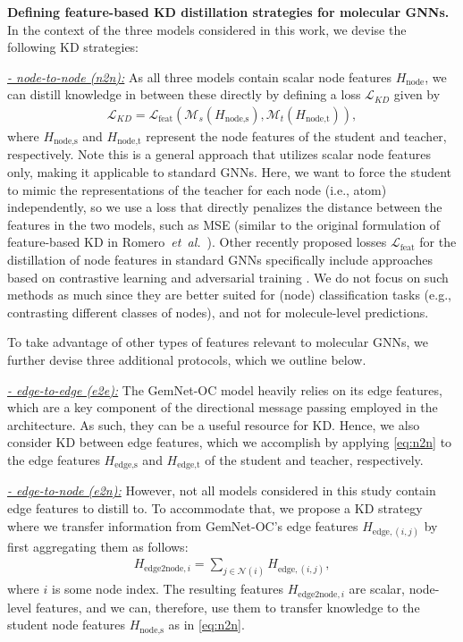 \documentclass{article}
\newcommand{\loss}{\mathcal{L}}
\begin{document}
\textbf{Defining feature-based KD distillation strategies for molecular GNNs.} 
In the context of the three models considered in this work, we devise the following KD strategies:

\underline{\emph{- node-to-node (n2n):}} As all three models contain scalar node features $H_{\text{node}}$, we can distill knowledge in between these directly by defining a loss $\loss_{KD}$ given by
\begin{align}
\label{eq:n2n}
    \loss_{KD} = \loss_{\text{feat}} (\mathcal{M}_{s}(H_{\text{node}, \text{s}}), \mathcal{M}_{t}(H_{\text{node},\text{t}})),
\end{align}
where $H_{\text{node}, \text{s}}$ and $H_{\text{node}, \text{t}}$ represent the node features of the student and teacher, respectively.
% 
Note this is a general approach that utilizes scalar node features only, making it applicable to standard GNNs. Here, we want to force the student to mimic the representations of the teacher for each node (i.e., atom) independently, so we use a loss that directly penalizes the distance between the features in the two models, such as MSE (similar to the original formulation of feature-based KD in Romero~\textit{et~al.}~\citep{romero2015fitnets}). Other recently proposed losses $\loss_{\text{feat}}$ for the distillation of node features in standard GNNs specifically include approaches based on contrastive learning \cite{yang2021distilling, joshi2022, yu2022sail, huo2022t2} and adversarial training \cite{he2022compressing}. We do not focus on such methods as much since they are better suited for (node) classification tasks (e.g., contrasting different classes of nodes), and not for molecule-level predictions.

To take advantage of other types of features relevant to molecular GNNs, we further devise three additional protocols, which we outline below.

\underline{\emph{- edge-to-edge (e2e):}} The GemNet-OC model heavily relies on its edge features, which are a key component of the directional message passing employed in the architecture. As such, they can be a useful resource for KD. Hence, we also consider KD between edge features, which we accomplish by applying \cref{eq:n2n} to the edge features $H_{\text{edge}, \text{s}}$ and $H_{\text{edge},\text{t}}$ of the student and teacher, respectively.

\underline{\emph{- edge-to-node (e2n):}} However, not all models considered in this study contain edge features to distill to. To accommodate that, we propose a KD strategy where we transfer information from GemNet-OC's edge features $H_{\text{edge}, (i,j)}$ by first aggregating them as follows:
\begin{align}
    H_{\text{edge2node}, i} = \sum_{j\in\mathcal{N}(i)} H_{\text{edge}, (i,j)},
\end{align}
where $i$ is some node index. The resulting features $H_{\text{edge2node}, i}$ are scalar, node-level features, and we can, therefore, use them to transfer knowledge to the student node features $H_{\text{node}, \text{s}}$ as in \cref{eq:n2n}.
\end{document}
